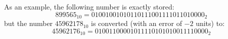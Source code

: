As an example, the following number is exactly stored: 
$$
899565_{10} = 01001001010110111001111011010000_2
$$
but the number $45962178_{10}$ is converted (with an error of $-2$ units) to:
$$
45962176_{10} = 01001100001011110101010011110000_2
$$






